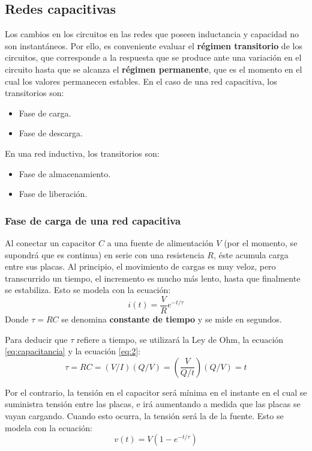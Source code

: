 \subsection{Redes capacitivas}
Los cambios en los circuitos en las redes que poseen inductancia y capacidad no son instantáneos. Por ello, es conveniente evaluar el \textbf{régimen transitorio} de los circuitos, que corresponde a la respuesta que se produce ante una variación en el circuito hasta que se alcanza el \textbf{régimen permanente}, que es el momento en el cual los valores permanecen estables.
En el caso de una red capacitiva, los transitorios son:
\begin{itemize}
	\item Fase de carga.
	\item Fase de descarga.
\end{itemize}
En una red inductiva, los transitorios son:
\begin{itemize}
	\item Fase de almacenamiento.
	\item Fase de liberación.
\end{itemize}
\subsubsection{Fase de carga de una red capacitiva}
Al conectar un capacitor $C$ a una fuente de alimentación $V$ (por el momento, se supondrá que es continua) en serie con una resistencia $R$, éste acumula carga entre sus placas. Al principio, el movimiento de cargas es muy veloz, pero transcurrido un tiempo, el incremento es mucho más lento, hasta que finalmente se estabiliza. Esto se modela con la ecuación:
\begin{equation}
	\label{eq:carga_capacitor_i}
	i(t)=\frac{V}{R}e^{-t / \tau}
\end{equation}
Donde $\tau = RC $ se denomina \textbf{constante de tiempo} y se mide en segundos.

Para deducir que $\tau$ refiere a tiempo, se utilizará la Ley de Ohm, la ecuación \ref{eq:capacitancia} y la ecuación \ref{eq:2}: $$ \tau = RC = (V/I)(Q/V)=(\frac{V}{Q/t})(Q/V)=t$$

Por el contrario, la tensión en el capacitor será mínima en el instante en el cual se suministra tensión entre las placas, e irá aumentando a medida que las placas se vayan cargando. Cuando esto ocurra, la tensión será la de la fuente. Esto se modela con la ecuación:
\begin{equation}
	\label{eq:carga_capacitor_v}
	v(t)=V(1-e^{-t / \tau})
\end{equation}

